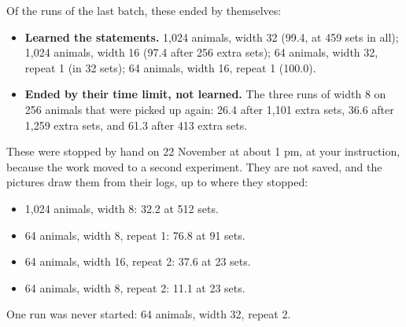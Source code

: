 Of the runs of the last batch, these ended by themselves:
\begin{itemize}
\item \textbf{Learned the statements.} 1,024 animals, width 32 (99.4, at 459 sets in all);
      1,024 animals, width 16 (97.4 after 256 extra sets); 64 animals, width 32, repeat 1 (in
      32 sets); 64 animals, width 16, repeat 1 (100.0).
\item \textbf{Ended by their time limit, not learned.} The three runs of width 8 on 256
      animals that were picked up again: 26.4 after 1,101 extra sets, 36.6 after 1,259 extra
      sets, and 61.3 after 413 extra sets.
\end{itemize}
These were stopped by hand on 22 November at about 1 pm, at your instruction, because the
work moved to a second experiment. They are not saved, and the pictures draw them from their
logs, up to where they stopped:
\begin{itemize}
\item 1,024 animals, width 8: 32.2 at 512 sets.
\item 64 animals, width 8, repeat 1: 76.8 at 91 sets.
\item 64 animals, width 16, repeat 2: 37.6 at 23 sets.
\item 64 animals, width 8, repeat 2: 11.1 at 23 sets.
\end{itemize}
One run was never started: 64 animals, width 32, repeat 2.
